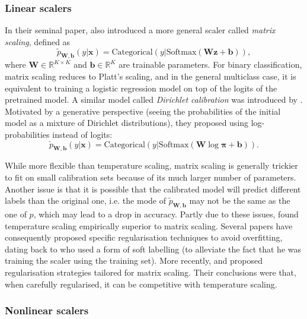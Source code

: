 \documentclass[10pt,dvipsnames]{article}
\newcommand{\bx}{\mathbf{x}}%
\newcommand{\bz}{\mathbf{z}}%
\newcommand{\bpi}{\boldsymbol{\pi}}%
\newcommand{\bW}{\mathbf{W}}%
\newcommand{\bb}{\mathbf{b}}%
\theoremstyle{plain}
\theoremstyle{definition}
\theoremstyle{remark}
\begin{document}
\subsubsection{Linear scalers}

 In their seminal paper, \citet{guo2017calibration} also introduced a more general scaler called \emph{matrix scaling}, defined as 
\begin{equation}
\label{eq:matscaling}
    \tilde{p}_{\bW,\bb}(y | \bx) = \text{Categorical}(y |\text{Softmax} (\bW \bz + \bb )),
\end{equation}
where $\bW \in \mathbb{R}^{K \times K}$ and  $\bb \in \mathbb{R}^K$ are trainable parameters. For binary classification, matrix scaling reduces to Platt's \citeyearpar{platt1999probabilistic} scaling, and in the general multiclass case, it is equivalent to training a logistic regression model on top of the logits of the pretrained model. A similar model called \emph{Dirichlet calibration} was introduced by \citet{kull2019beyond}. Motivated by a generative perspective (seeing the probabilities of the initial model as a mixture of Dirichlet distributions), they proposed using log-probabilities instead of logits:
\begin{equation}
\label{eq:dirichlet}
    \check{p}_{\bW,\bb}(y | \bx) = \text{Categorical}(y |\text{Softmax} (\bW \log \bpi + \bb )).
\end{equation}

While more flexible than temperature scaling, matrix scaling is generally trickier to fit on small calibration sets because of its much larger number of parameters. Another issue is that it is possible that the calibrated model will predict different labels than the original one, i.e. the mode of $\tilde{p}_{\bW,\bb}$ may not be the same as the one of $p$, which may lead to a drop in accuracy. Partly due to these issues, \citet{guo2017calibration} found temperature scaling empirically superior to matrix scaling. Several papers have consequently proposed specific regularisation techniques to avoid overfitting, dating back to \citet{platt1999probabilistic} who used a form of soft labelling (to alleviate the fact that he was training the scaler using the training set). More recently, \citet{kull2019beyond} and \citet{berta2025structured} proposed regularisation strategies tailored for matrix scaling. Their conclusions were that, when carefully regularised, it can be competitive with temperature scaling.




\subsubsection{Nonlinear scalers}
\end{document}
